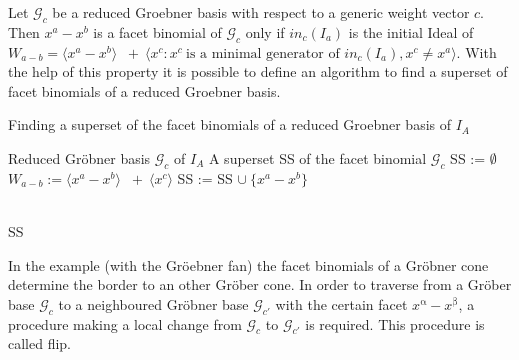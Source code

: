 Let $\mathcal{G}_{c} $ be a reduced Groebner basis with respect to a generic weight vector $c$. Then $x^{a} - x^{b}$ is a facet binomial of $\mathcal{G}_{c}$ only if $in_{c}(I_{a}) $ is the initial Ideal of $W_{a - b} = \langle x^{a}-x^{b}\rangle$
$~+~ \langle x^{c}  : x^{c}~\textrm{is a minimal generator of~} in_{c}(I_{a}), x^{c} \neq x^{a} \rangle$.\cite{tigers}
With the help of this property it is possible to define an algorithm to find a superset of facet binomials of a reduced Groebner basis.

\begin{algorithm}
\caption{Finding a superset of the facet binomials
of a reduced Groebner basis of $I_A$ \cite{tigers}}
\label{alg:facetSS}
\begin{algorithmic}[1]

\Require
Reduced Gröbner basis $ \mathcal{G}_{c} $ of $I_A$
\Ensure A superset SS of the facet binomial $\mathcal{G}_{c}$
\State SS := $\emptyset$
\State $W_{a - b} := \langle x^{a}-x^{b}\rangle$
$~+~ \langle x^{c} \rangle$ 
\State SS := SS $\cup~ \{x^{a}-x^{b} \}$

\EndIf
\EndFor \\
\Return SS

\end{algorithmic}
\end{algorithm}
 






In the example (with the Gröebner fan) the facet binomials of a Gröbner cone determine the border to an other Gröber cone.
In order to traverse from a Gröber base $\mathcal{G}_c$ to a neighboured Gröbner base $\mathcal{G}_{c'}$ with the certain facet $x^{\upalpha}-x^{\upbeta} $, a procedure making a local change from $\mathcal{G}_c$ to $\mathcal{G}_{c'}$ is required.
This procedure is called flip.



